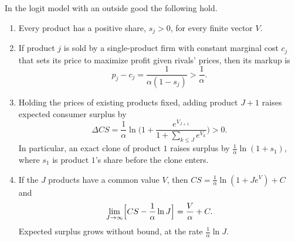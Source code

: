 \begin{proposition}\label{prop:06-logit-exhaust}
In the logit model with an outside good the following hold.
\begin{enumerate}[label=(\roman*)]
\item Every product has a positive share, $s_j > 0$, for every finite vector $V$.
\item If product $j$ is sold by a single-product firm with constant marginal cost $c_j$ that sets its price to
maximize profit given rivals' prices, then its markup is
\begin{equation}\label{eq:06-logit-markup}
  p_j - c_j = \frac{1}{\alpha(1 - s_j)} > \frac{1}{\alpha}.
\end{equation}
\item Holding the prices of existing products fixed, adding product $J+1$ raises expected consumer surplus by
\begin{equation}\label{eq:06-logit-gain}
  \Delta CS = \frac{1}{\alpha} \ln\biggl(1 + \frac{e^{V_{J+1}}}{1 + \sum_{k \le J} e^{V_k}}\biggr) > 0 .
\end{equation}
In particular, an exact clone of product $1$ raises surplus by $\frac{1}{\alpha}\ln(1 + s_1)$, where $s_1$ is product
$1$'s share before the clone enters.
\item If the $J$ products have a common value $V$, then $CS = \frac{1}{\alpha}\ln(1 + J e^{V}) + C$ and
\begin{equation}\label{eq:06-logit-lnJ}
  \lim_{J \to \infty} \Bigl[ CS - \frac{1}{\alpha} \ln J \Bigr] = \frac{V}{\alpha} + C .
\end{equation}
Expected surplus grows without bound, at the rate $\frac{1}{\alpha}\ln J$.
\end{enumerate}
\end{proposition}


